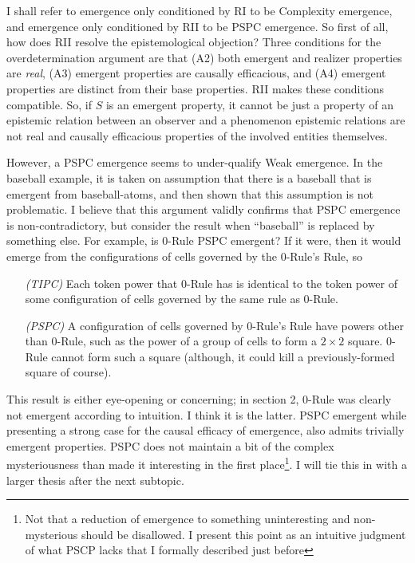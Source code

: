 \documentclass{article}
\newcommand{\ti}[1]{\textit{#1}}
\begin{document}

I shall refer to emergence only conditioned by RI to be Complexity emergence, and emergence only conditioned by RII to be PSPC emergence. So first of all, how does RII resolve the epistemological objection? Three conditions for the overdetermination argument are that (A2) both emergent and realizer properties are \ti{real}, (A3) emergent properties are causally efficacious, and (A4) emergent properties are distinct from their base properties. RII makes these conditions compatible. So, if $S$ is an emergent property, it cannot be just a property of an epistemic relation between an observer and a phenomenon epistemic relations are not real and causally efficacious properties of the involved entities themselves.

However, a PSPC emergence seems to under-qualify Weak emergence. In the baseball example, it is taken on assumption that there is a baseball that is emergent from baseball-atoms, and then shown that this assumption is not problematic. I believe that this argument validly confirms that PSPC emergence is non-contradictory, but consider the result when ``baseball'' is replaced by something else. For example, is 0-Rule PSPC emergent? If it were, then it would emerge from the configurations of cells governed by the 0-Rule's Rule, so

\begin{itemize}
\item[\ti{(TIPC)}] Each token power that 0-Rule has is identical to the token power of some configuration of cells governed by the same rule as 0-Rule.
\item[\ti{(PSPC)}] A configuration of cells governed by 0-Rule's Rule have powers other than 0-Rule, such as the power of a group of cells to form a $2 \times 2$ square. 0-Rule cannot form such a square (although, it could kill a previously-formed square of course).
\end{itemize}

This result is either eye-opening or concerning; in section 2, 0-Rule was clearly not emergent according to intuition. I think it is the latter. PSPC emergent while presenting a strong case for the causal efficacy of emergence, also admits trivially emergent properties. PSPC does not maintain a bit of the complex mysteriousness than made it interesting in the first place\footnote{Not that a reduction of emergence to something uninteresting and non-mysterious should be disallowed. I present this point as an intuitive judgment of what PSCP lacks that I formally described just before}. I will tie this in with a larger thesis after the next subtopic.
\end{document}
